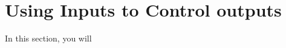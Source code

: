 \documentclass[11pt,a4paper]{article}
\begin{document}



\section{Using Inputs to Control outputs} %
\label{sec:using_inputs_to_control_outputs}

In this section, you will 


 
 \nocite{*}
\end{document}
